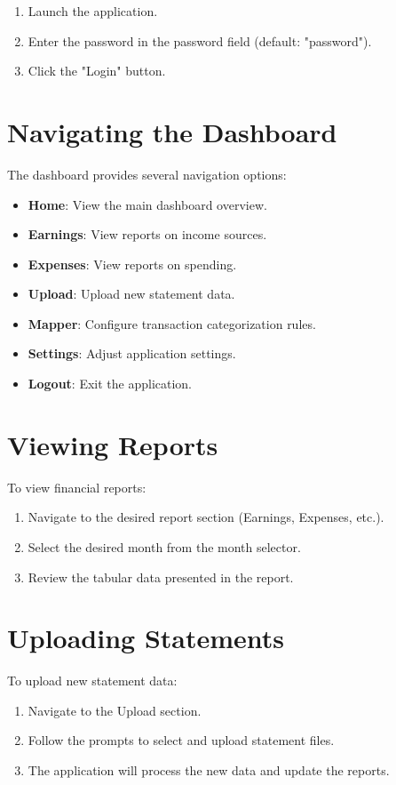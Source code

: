 \documentclass[11pt,a4paper]{report}
\begin{document}
\begin{enumerate}
    \item Launch the application.
    \item Enter the password in the password field (default: "password").
    \item Click the "Login" button.
\end{enumerate}

\section{Navigating the Dashboard}
The dashboard provides several navigation options:

\begin{itemize}
    \item \textbf{Home}: View the main dashboard overview.
    \item \textbf{Earnings}: View reports on income sources.
    \item \textbf{Expenses}: View reports on spending.
    \item \textbf{Upload}: Upload new statement data.
    \item \textbf{Mapper}: Configure transaction categorization rules.
    \item \textbf{Settings}: Adjust application settings.
    \item \textbf{Logout}: Exit the application.
\end{itemize}

\section{Viewing Reports}
To view financial reports:

\begin{enumerate}
    \item Navigate to the desired report section (Earnings, Expenses, etc.).
    \item Select the desired month from the month selector.
    \item Review the tabular data presented in the report.
\end{enumerate}

\section{Uploading Statements}
To upload new statement data:

\begin{enumerate}
    \item Navigate to the Upload section.
    \item Follow the prompts to select and upload statement files.
    \item The application will process the new data and update the reports.
\end{enumerate}
\end{document}
